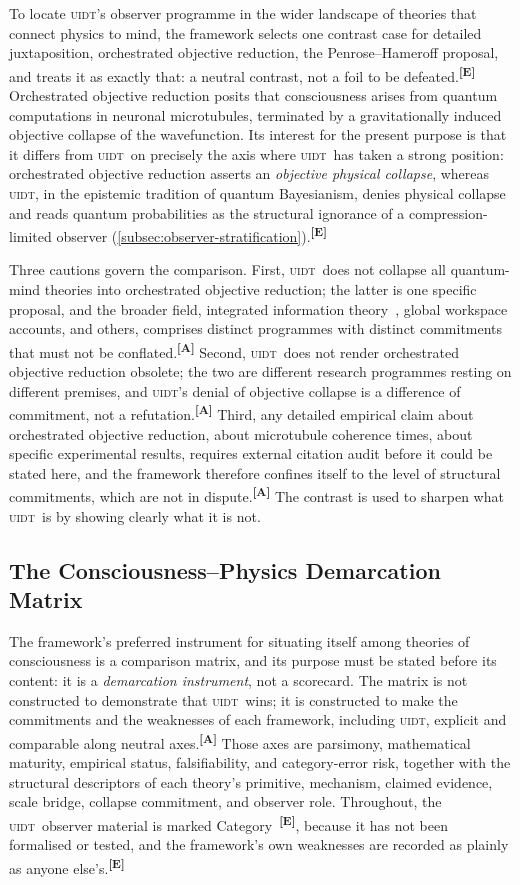 \documentclass[12pt,a4paper,twoside]{article}
\theoremstyle{plain}
\theoremstyle{definition}
\theoremstyle{remark}
\newcommand{\UIDT}{\textsc{uidt}}
\newcommand{\catmark}[1]{\textsuperscript{\textsf{\textbf{[#1]}}}}
\begin{document}
To locate \UIDT's observer programme in the wider landscape of theories that connect physics to mind, the framework selects one contrast case for detailed juxtaposition, orchestrated objective reduction, the Penrose--Hameroff proposal, and treats it as exactly that: a neutral contrast, not a foil to be defeated.\catmark{E} Orchestrated objective reduction posits that consciousness arises from quantum computations in neuronal microtubules, terminated by a gravitationally induced objective collapse of the wavefunction. Its interest for the present purpose is that it differs from \UIDT\ on precisely the axis where \UIDT\ has taken a strong position: orchestrated objective reduction asserts an \emph{objective physical collapse}, whereas \UIDT, in the epistemic tradition of quantum Bayesianism, denies physical collapse and reads quantum probabilities as the structural ignorance of a compression-limited observer (\cref{subsec:observer-stratification}).\catmark{E}

Three cautions govern the comparison. First, \UIDT\ does not collapse all quantum-mind theories into orchestrated objective reduction; the latter is one specific proposal, and the broader field, integrated information theory~\cite{tononi2004}, global workspace accounts, and others, comprises distinct programmes with distinct commitments that must not be conflated.\catmark{A} Second, \UIDT\ does not render orchestrated objective reduction obsolete; the two are different research programmes resting on different premises, and \UIDT's denial of objective collapse is a difference of commitment, not a refutation.\catmark{A} Third, any detailed empirical claim about orchestrated objective reduction, about microtubule coherence times, about specific experimental results, requires external citation audit before it could be stated here, and the framework therefore confines itself to the level of structural commitments, which are not in dispute.\catmark{A} The contrast is used to sharpen what \UIDT\ is by showing clearly what it is not.

\subsection{The Consciousness--Physics Demarcation Matrix}
\label{subsec:demarcation-matrix}

The framework's preferred instrument for situating itself among theories of consciousness is a comparison matrix, and its purpose must be stated before its content: it is a \emph{demarcation instrument}, not a scorecard. The matrix is not constructed to demonstrate that \UIDT\ wins; it is constructed to make the commitments and the weaknesses of each framework, including \UIDT, explicit and comparable along neutral axes.\catmark{A} Those axes are parsimony, mathematical maturity, empirical status, falsifiability, and category-error risk, together with the structural descriptors of each theory's primitive, mechanism, claimed evidence, scale bridge, collapse commitment, and observer role. Throughout, the \UIDT\ observer material is marked Category~\catmark{E}, because it has not been formalised or tested, and the framework's own weaknesses are recorded as plainly as anyone else's.\catmark{E}
\end{document}
